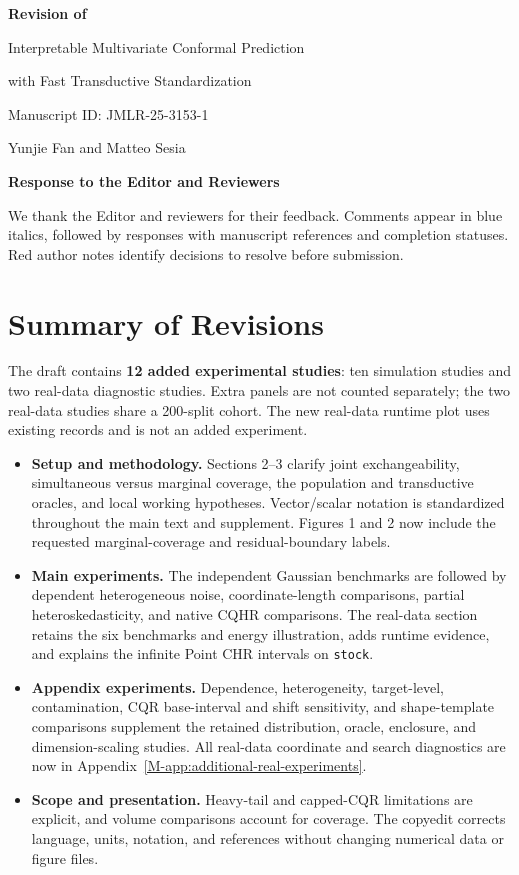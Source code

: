 \documentclass[11pt]{article}
\newcommand{\msapp}[1]{Appendix~\ref*{M-#1}}
\begin{document}
\begin{center}
{\Large\bfseries Revision of\par
Interpretable Multivariate Conformal Prediction\par
with Fast Transductive Standardization\par}
\vspace{0.7em}
Manuscript ID: JMLR-25-3153-1\par
Yunjie Fan and Matteo Sesia\par
\vspace{0.5em}
{\large\bfseries Response to the Editor and Reviewers}
\end{center}
We thank the Editor and reviewers for their feedback. Comments appear in
blue italics, followed by responses with manuscript references and completion
statuses. Red author notes identify decisions to resolve before submission.

\section*{Summary of Revisions}
The draft contains \textbf{12 added experimental studies}: ten simulation
studies and two real-data diagnostic studies. Extra panels are not counted
separately; the two real-data studies share a 200-split cohort. The new
real-data runtime plot uses existing records and is not an added experiment.

\begin{itemize}
\item \textbf{Setup and methodology.} Sections 2--3 clarify joint
exchangeability, simultaneous versus marginal coverage, the population and
transductive oracles, and local working hypotheses. Vector/scalar notation
is standardized throughout the main text and supplement. Figures 1 and 2
now include the requested marginal-coverage and residual-boundary labels.
\item \textbf{Main experiments.} The independent Gaussian benchmarks are
followed by dependent heterogeneous noise, coordinate-length comparisons,
partial heteroskedasticity, and native CQHR comparisons. The real-data
section retains the six benchmarks and energy illustration, adds runtime
evidence, and explains the infinite Point CHR intervals on \texttt{stock}.
\item \textbf{Appendix experiments.} Dependence, heterogeneity, target-level,
contamination, CQR base-interval and shift sensitivity, and shape-template
comparisons supplement the retained distribution, oracle, enclosure, and
dimension-scaling studies. All real-data coordinate and search diagnostics
are now in \msapp{app:additional-real-experiments}.
\item \textbf{Scope and presentation.} Heavy-tail and capped-CQR limitations
are explicit, and volume comparisons account for coverage. The copyedit
corrects language, units, notation, and references without changing numerical
data or figure files.
\end{itemize}
\end{document}
